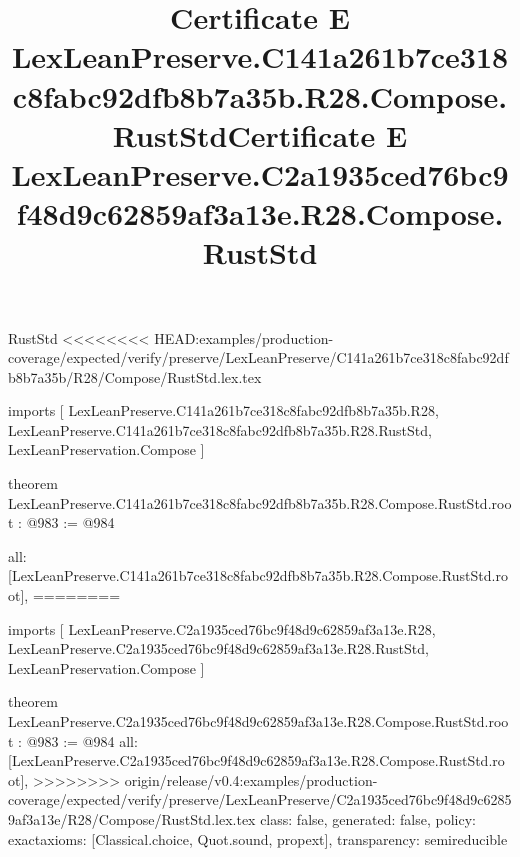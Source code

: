 \begin{lexlean}{RustStd}
<<<<<<<< HEAD:examples/production-coverage/expected/verify/preserve/LexLeanPreserve/C141a261b7ce318c8fabc92dfb8b7a35b/R28/Compose/RustStd.lex.tex
\title{Certificate E LexLeanPreserve.C141a261b7ce318c8fabc92dfb8b7a35b.R28.Compose.RustStd}
\begin{coremodule}
imports [
  LexLeanPreserve.C141a261b7ce318c8fabc92dfb8b7a35b.R28,
  LexLeanPreserve.C141a261b7ce318c8fabc92dfb8b7a35b.R28.RustStd,
  LexLeanPreservation.Compose
]

theorem LexLeanPreserve.C141a261b7ce318c8fabc92dfb8b7a35b.R28.Compose.RustStd.root : @983 := @984 {
  all: [LexLeanPreserve.C141a261b7ce318c8fabc92dfb8b7a35b.R28.Compose.RustStd.root],
========
\title{Certificate E LexLeanPreserve.C2a1935ced76bc9f48d9c62859af3a13e.R28.Compose.RustStd}
\begin{coremodule}
imports [
  LexLeanPreserve.C2a1935ced76bc9f48d9c62859af3a13e.R28,
  LexLeanPreserve.C2a1935ced76bc9f48d9c62859af3a13e.R28.RustStd,
  LexLeanPreservation.Compose
]

theorem LexLeanPreserve.C2a1935ced76bc9f48d9c62859af3a13e.R28.Compose.RustStd.root : @983 := @984 {
  all: [LexLeanPreserve.C2a1935ced76bc9f48d9c62859af3a13e.R28.Compose.RustStd.root],
>>>>>>>> origin/release/v0.4:examples/production-coverage/expected/verify/preserve/LexLeanPreserve/C2a1935ced76bc9f48d9c62859af3a13e/R28/Compose/RustStd.lex.tex
  class: false,
  generated: false,
  policy: exact{axioms: [Classical.choice, Quot.sound, propext]},
  transparency: semireducible
}


\end{coremodule}}
\end{coremodule}
\end{lexlean}
